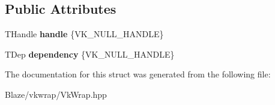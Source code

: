 \subsection*{Public Attributes}
\begin{DoxyCompactItemize}
\item 
\mbox{\label{structblaze_1_1vkw_1_1DependentHolder_acc67532a3e573dbf1c3709ae67ca9701}} 
T\+Handle {\bfseries handle} \{V\+K\+\_\+\+N\+U\+L\+L\+\_\+\+H\+A\+N\+D\+LE\}
\item 
\mbox{\label{structblaze_1_1vkw_1_1DependentHolder_ab864b48f88806519d5743fdc625f5bfd}} 
T\+Dep {\bfseries dependency} \{V\+K\+\_\+\+N\+U\+L\+L\+\_\+\+H\+A\+N\+D\+LE\}
\end{DoxyCompactItemize}


The documentation for this struct was generated from the following file\+:\begin{DoxyCompactItemize}
\item 
Blaze/vkwrap/Vk\+Wrap.\+hpp\end{DoxyCompactItemize}
